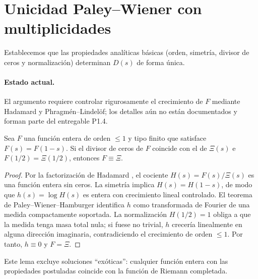 \section{Unicidad Paley--Wiener con multiplicidades}

Establecemos que las propiedades analíticas básicas (orden, simetría, divisor
de ceros y normalización) determinan $D(s)$ de forma única.

\paragraph{Estado actual.}
El argumento requiere controlar rigurosamente el crecimiento de $F$ mediante
Hadamard y Phragm\'en--Lindel\"of; los detalles aún no están documentados y forman
parte del entregable P1.4.

\begin{lemma}[Unicidad]\label{lem:paper-uniqueness}
Sea $F$ una función entera de orden $\leqslant 1$ y tipo finito que satisface
$F(s)=F(1-s)$.  Si el divisor de ceros de $F$ coincide con el de $\Xi(s)$ e
$F(1/2)=\Xi(1/2)$, entonces $F\equiv \Xi$.
\end{lemma}

\begin{proof}
Por la factorización de Hadamard
\cite[Chap.~II]{Tate1967}, el cociente $H(s)=F(s)/\Xi(s)$ es una función entera
sin ceros.  La simetría implica $H(s)=H(1-s)$, de modo que $h(s)=\log H(s)$ es
entera con crecimiento lineal controlado.  El teorema de
Paley--Wiener--Hamburger
\cite[Thm.~5]{Hamburger1921}
identifica $h$ como transformada de Fourier de una medida compactamente
soportada.  La normalización $H(1/2)=1$ obliga a que la medida tenga masa total
nula; si fuese no trivial, $h$ crecería linealmente en alguna dirección
imaginaria, contradiciendo el crecimiento de orden $\leqslant1$.  Por tanto,
$h\equiv0$ y $F=\Xi$.
\end{proof}

Este lema excluye soluciones ``exóticas'': cualquier función entera con las
propiedades postuladas coincide con la función de Riemann completada.
